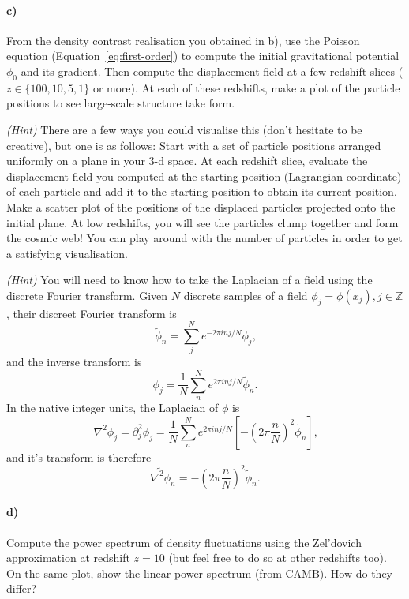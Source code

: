 \documentclass[12pt]{article}
\begin{document}
\paragraph{c)} From the density contrast realisation you obtained in b), use the
Poisson equation (Equation~\ref{eq:first-order}) to compute the initial
gravitational potential $\phi_0$ and its gradient. Then compute the
displacement field at a few redshift slices ($z \in \{100, 10, 5, 1\}$ or more).
At each of these redshifts, make a plot of the particle positions to see
large-scale structure take form.

\emph{(Hint)} There are a few ways you could visualise this (don't hesitate to
be creative), but one is as follows: Start with a set of particle positions
arranged uniformly on a plane in your 3-d space. At each redshift slice,
evaluate the displacement field you computed at the starting position
(Lagrangian coordinate) of each particle and add it to the starting position to
obtain its current position. Make a scatter plot of the positions of the
displaced particles projected onto the initial plane. At low redshifts, you will
see the particles clump together and form the cosmic web! You can play around
with the number of particles in order to get a satisfying visualisation.

\emph{(Hint)} You will need to know how to take the Laplacian of a field using
the discrete Fourier transform. Given $N$ discrete samples of a field $\phi_j =
\phi(x_j), j \in \mathbb{Z}$, their discreet Fourier transform is
\begin{equation}
    \tilde{\phi}_n = \sum_j^N e^{-2 \pi i n j / N} \phi_j \text{,}
\end{equation}
and the inverse transform is
\begin{equation}
    \phi_j = \frac{1}{N}\sum_n^N e^{2 \pi i n j / N} \tilde{\phi}_n \text{.}
\end{equation}
In the native integer units, the Laplacian of $\phi$ is
\begin{equation}
    \nabla^2 \phi_j = \partial_j^2 \phi_j = \frac{1}{N}\sum_n^N e^{2 \pi i n j / N}
    \left[- \left(2 \pi \frac{n}{N}\right)^2 \tilde{\phi}_n \right] \text{,}
\end{equation}
and it's transform is therefore
\begin{equation}
    \tilde{\nabla^2 \phi}_n = - \left(2 \pi \frac{n}{N}\right)^2 \tilde{\phi}_n \text{.}
\end{equation}

\paragraph{d)} Compute the power spectrum of density fluctuations using the
Zel'dovich approximation at redshift $z=10$ (but feel free to do so at other
redshifts too). On the same plot, show the linear power spectrum (from CAMB).
How do they differ?
\end{document}
